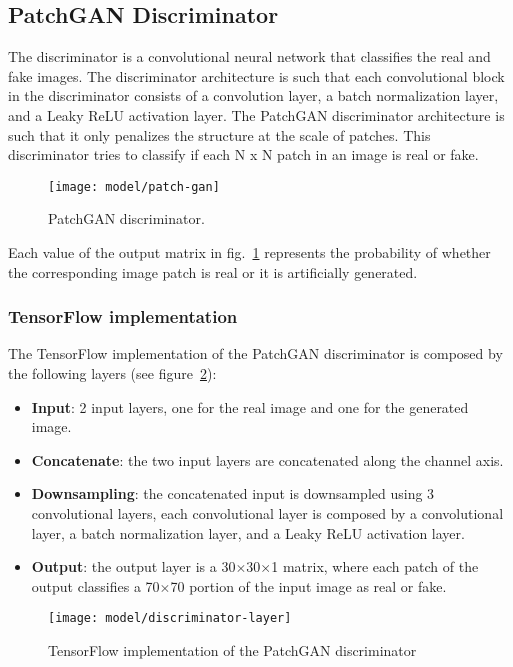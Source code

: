 \subsection{PatchGAN Discriminator}\label{subsec:patchgan-discriminator}
The discriminator is a convolutional neural network that classifies the real and fake
images. The discriminator architecture is such that each convolutional block in the
discriminator consists of a convolution layer, a batch normalization layer, and a Leaky
ReLU activation layer. The PatchGAN discriminator architecture is such that it only penalizes
the structure at the scale of patches. This discriminator tries to classify if each N x N
patch in an image is real or fake.
\begin{figure}[H]
    \centering
    \texttt{[image: model/patch-gan]}
    \caption{PatchGAN discriminator.}\label{fig:patchgan}
\end{figure}
Each value of the output matrix in fig.~\ref*{fig:patchgan} represents the probability of whether the corresponding image patch is real or it is artificially generated.
\subsubsection{TensorFlow implementation}
The TensorFlow implementation of the PatchGAN discriminator is composed by the following layers (see figure~\ref{fig:dis-layer}):
\begin{itemize}
    \item \textbf{Input}: 2 input layers, one for the real image and one for the generated image.
    \item \textbf{Concatenate}: the two input layers are concatenated along the channel axis.
    \item \textbf{Downsampling}: the concatenated input is downsampled using 3 convolutional layers, each convolutional layer is composed by a convolutional layer, a batch normalization layer, and a Leaky ReLU activation layer.
    \item \textbf{Output}: the output layer is a 30$\times$30$\times$1 matrix, where each patch of the output classifies a 70$\times$70 portion of the input image as real or fake.
\end{itemize}
\begin{figure}[H]
    \centering
    \texttt{[image: model/discriminator-layer]}
    \caption{TensorFlow implementation of the PatchGAN discriminator}\label{fig:dis-layer}
\end{figure}
